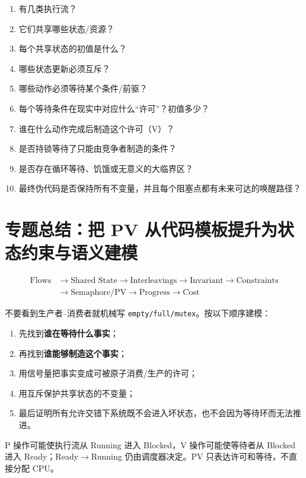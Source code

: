 \documentclass[11pt,a4paper]{ctexart}
\newcommand{\kw}[1]{\textbf{#1}}
\newcommand{\code}[1]{\texttt{#1}}
\begin{document}
\begin{exam}[拿到 PV 大题，按顺序问]
\begin{enumerate}
\item 有几类执行流？
\item 它们共享哪些状态/资源？
\item 每个共享状态的初值是什么？
\item 哪些状态更新必须互斥？
\item 哪些动作必须等待某个条件/前驱？
\item 每个等待条件在现实中对应什么“许可”？初值多少？
\item 谁在什么动作完成后制造这个许可（V）？
\item 是否持锁等待了只能由竞争者制造的条件？
\item 是否存在循环等待、饥饿或无意义的大临界区？
\item 最终伪代码是否保持所有不变量，并且每个阻塞点都有未来可达的唤醒路径？
\end{enumerate}
\end{exam}

\section{专题总结：把 PV 从代码模板提升为状态约束与语义建模}

\begin{corebox}[最终核心模型]
\[
\boxed{
\begin{aligned}
\text{Flows}&\to\text{Shared State}\to\text{Interleavings}\to\text{Invariant}\to\text{Constraints}\\
&\to\text{Semaphore/PV}\to\text{Progress}\to\text{Cost}
\end{aligned}}
\]
\end{corebox}

不要看到生产者--消费者就机械写 \code{empty/full/mutex}。按以下顺序建模：
\begin{enumerate}
\item 先找到\kw{谁在等待什么事实}；
\item 再找到\kw{谁能够制造这个事实}；
\item 用信号量把事实变成可被原子消费/生产的许可；
\item 用互斥保护共享状态的不变量；
\item 最后证明所有允许交错下系统既不会进入坏状态，也不会因为等待环而无法推进。
\end{enumerate}

\begin{method}[与进程调度的接口]
P 操作可能使执行流从 Running 进入 Blocked，V 操作可能使等待者从 Blocked 进入 Ready；Ready$\to$Running 仍由调度器决定。PV 只表达许可和等待，不直接分配 CPU。
\end{method}
\end{document}
